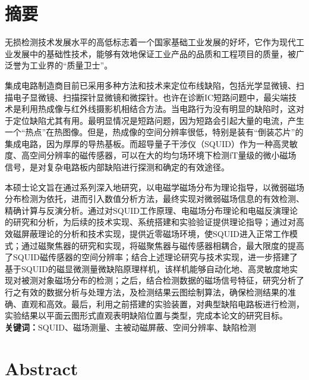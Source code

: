 \documentclass[a4paper,12pt，twoside]{ctexart}
\begin{document}
	\section*{摘要}	
	无损检测技术发展水平的高低标志着一个国家基础工业发展的好坏，它作为现代工业发展中的基础性技术，能够有效地保证工业产品的品质和工程项目的质量，被广泛誉为工业界的“质量卫士”。\par
	集成电路制造商目前已采用多种方法和技术来定位布线缺陷，包括光学显微镜、扫描电子显微镜、扫描探针显微镜和微探针。也许在诊断IC短路问题中，最尖端技术是利用热成像与红外线摄影机相结合方法。当电路行为没有明显的缺陷时，这对于定位缺陷尤其有用。最明显情况是短路问题，因为短路会引起大量的电流，产生一个“热点”在热图像。但是，热成像的空间分辨率很低，特别是装有“倒装芯片”的集成电路，因为厚厚的导热基板。而超导量子干涉仪（SQUID）作为一种高灵敏度、高空间分辨率的磁传感器，可以在大的均匀场环境下检测fT量级的微小磁场信号，是对复杂电路板内部缺陷进行探测和确定的有效途径。\par
	本硕士论文旨在通过系列深入地研究，以电磁学磁场分布为理论指导，以微弱磁场分布检测为依托，进而引入数值分析方法，最终实现对微弱磁场信息的有效检测、精确计算与反演分析。通过对SQUID工作原理、电磁场分布理论和电磁反演理论的研究和分析，为后续的技术实现、系统搭建和实验验证提供理论指导；通过对高效磁屏蔽理论的分析和技术实现，提供近零磁场环境，使SQUID进入正常工作模式；通过磁聚焦器的研究和实现，将磁聚焦器与磁传感器相耦合，最大限度的提高了SQUID磁传感器的空间分辨率；结合上述理论研究与技术实现，进一步搭建了基于SQUID的磁显微测量微缺陷原理样机，该样机能够自动化地、高灵敏度地实现对被测对象磁场分布的检测；之后，结合检测数据的磁场信号特征，研究分析了行之有效的数据分析与处理方法，及检测结果云图绘制算法，确保检测结果的准确、直观和高效。最后，利用之前搭建的实验装置，对典型缺陷电路板进行检测，实验结果以平面云图形式直观表明缺陷位置与类型，完成本论文的研究目标。
		\\ \textbf{关键词：}SQUID、磁场测量、主被动磁屏蔽、空间分辨率、缺陷检测
		
		
	\newpage
		
	\section*{Abstract}
	
	
		
\end{document}
